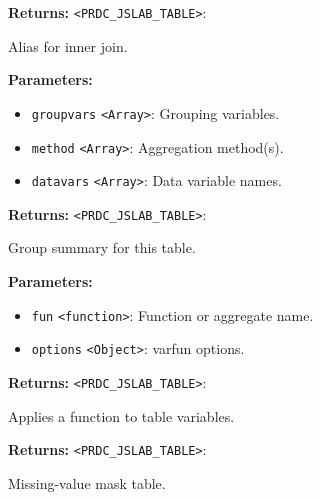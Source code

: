 \documentclass[12pt,a4paper]{article}
\begin{document}
\noindent \textbf{Returns:} \texttt{<PRDC\_JSLAB\_TABLE>}:

\noindent Alias for inner join.

\vspace{5mm}
\noindent {}


\noindent \textbf{Parameters:}
\begin{itemize}
  \item \texttt{groupvars} \texttt{<Array>}: Grouping variables.
  \item \texttt{method} \texttt{<Array>}: Aggregation method(s).
  \item \texttt{datavars} \texttt{<Array>}: Data variable names.
\end{itemize}

\noindent \textbf{Returns:} \texttt{<PRDC\_JSLAB\_TABLE>}:

\noindent Group summary for this table.

\vspace{5mm}
\noindent {}


\noindent \textbf{Parameters:}
\begin{itemize}
  \item \texttt{fun} \texttt{<function>}: Function or aggregate name.
  \item \texttt{options} \texttt{<Object>}: varfun options.
\end{itemize}

\noindent \textbf{Returns:} \texttt{<PRDC\_JSLAB\_TABLE>}:

\noindent Applies a function to table variables.

\vspace{5mm}
\noindent {}


\noindent \textbf{Returns:} \texttt{<PRDC\_JSLAB\_TABLE>}:

\noindent Missing-value mask table.

\vspace{5mm}
\noindent {}
\end{document}
